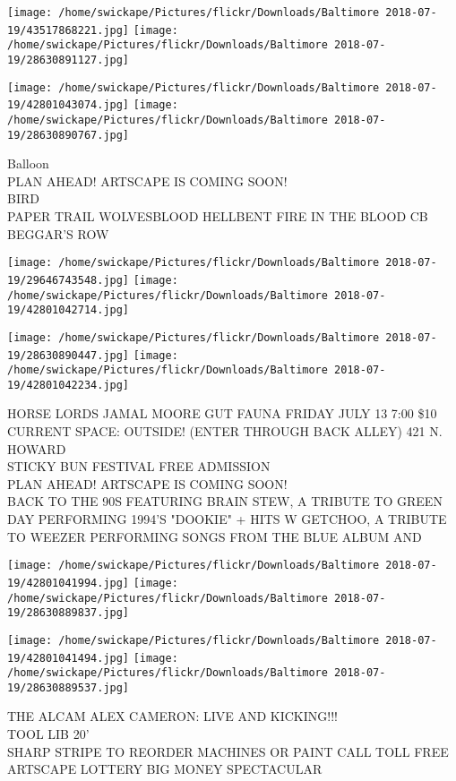 \documentclass[10pt,letterpaper]{article}
\begin{document}
\texttt{[image: /home/swickape/Pictures/flickr/Downloads/Baltimore 2018-07-19/43517868221.jpg]}
\texttt{[image: /home/swickape/Pictures/flickr/Downloads/Baltimore 2018-07-19/28630891127.jpg]}

\texttt{[image: /home/swickape/Pictures/flickr/Downloads/Baltimore 2018-07-19/42801043074.jpg]}
\texttt{[image: /home/swickape/Pictures/flickr/Downloads/Baltimore 2018-07-19/28630890767.jpg]}

Balloon\\
PLAN AHEAD!  ARTSCAPE IS COMING SOON!\\
BIRD\\
PAPER TRAIL WOLVESBLOOD HELLBENT FIRE IN THE BLOOD CB BEGGAR'S ROW
\pagebreak

\texttt{[image: /home/swickape/Pictures/flickr/Downloads/Baltimore 2018-07-19/29646743548.jpg]}
\texttt{[image: /home/swickape/Pictures/flickr/Downloads/Baltimore 2018-07-19/42801042714.jpg]}

\texttt{[image: /home/swickape/Pictures/flickr/Downloads/Baltimore 2018-07-19/28630890447.jpg]}
\texttt{[image: /home/swickape/Pictures/flickr/Downloads/Baltimore 2018-07-19/42801042234.jpg]}

HORSE LORDS JAMAL MOORE GUT FAUNA FRIDAY JULY 13 7:00 \$10 CURRENT SPACE: OUTSIDE! (ENTER THROUGH BACK ALLEY) 421 N. HOWARD\\
STICKY BUN FESTIVAL FREE ADMISSION\\
PLAN AHEAD!  ARTSCAPE IS COMING SOON!\\
BACK TO THE 90S FEATURING BRAIN STEW, A TRIBUTE TO GREEN DAY PERFORMING 1994'S "DOOKIE" + HITS W GETCHOO, A TRIBUTE TO WEEZER PERFORMING SONGS FROM THE BLUE ALBUM AND
\pagebreak

\texttt{[image: /home/swickape/Pictures/flickr/Downloads/Baltimore 2018-07-19/42801041994.jpg]}
\texttt{[image: /home/swickape/Pictures/flickr/Downloads/Baltimore 2018-07-19/28630889837.jpg]}

\texttt{[image: /home/swickape/Pictures/flickr/Downloads/Baltimore 2018-07-19/42801041494.jpg]}
\texttt{[image: /home/swickape/Pictures/flickr/Downloads/Baltimore 2018-07-19/28630889537.jpg]}

THE ALCAM ALEX CAMERON: LIVE AND KICKING!!!\\
TOOL LIB 20'\\
SHARP STRIPE TO REORDER MACHINES OR PAINT CALL TOLL FREE\\
ARTSCAPE LOTTERY BIG MONEY SPECTACULAR
\pagebreak
\end{document}
